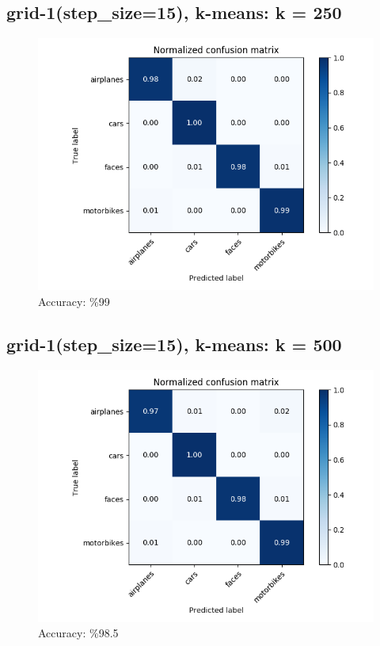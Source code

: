 \subsection*{grid-1(step\_size=15), k-means: k = 250}
\begin{figure}[H]
    \centering
    \includegraphics[scale = 0.45]{images/confusion-stp-15-250.png}
    \caption*{Accuracy: \%99}
\end{figure}

\subsection*{grid-1(step\_size=15), k-means: k = 500}
\begin{figure}[H]
    \centering
    \includegraphics[scale = 0.45]{images/confusion-stp-15-500.png}
    \caption*{Accuracy: \%98.5}
\end{figure}

